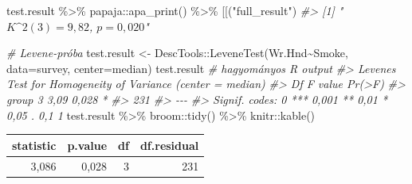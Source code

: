 \documentclass[
]{book}
\newenvironment{Shaded}{\begin{snugshade}}{\end{snugshade}}
\newcommand{\AttributeTok}[1]{\textcolor[rgb]{0.77,0.63,0.00}{#1}}
\newcommand{\CommentTok}[1]{\textcolor[rgb]{0.56,0.35,0.01}{\textit{#1}}}
\newcommand{\FunctionTok}[1]{\textcolor[rgb]{0.00,0.00,0.00}{#1}}
\newcommand{\NormalTok}[1]{#1}
\newcommand{\OtherTok}[1]{\textcolor[rgb]{0.56,0.35,0.01}{#1}}
\newcommand{\SpecialCharTok}[1]{\textcolor[rgb]{0.00,0.00,0.00}{#1}}
\newcommand{\StringTok}[1]{\textcolor[rgb]{0.31,0.60,0.02}{#1}}
\begin{document}
\begin{Shaded}
\begin{Highlighting}[]
\NormalTok{test.result }\SpecialCharTok{\%\textgreater{}\%}\NormalTok{ papaja}\SpecialCharTok{::}\FunctionTok{apa\_print}\NormalTok{() }\SpecialCharTok{\%\textgreater{}\%} \StringTok{\textasciigrave{}}\AttributeTok{[[}\StringTok{\textasciigrave{}}\NormalTok{(}\StringTok{"full\_result"}\NormalTok{)}
\CommentTok{\#\textgreater{} [1] "$K\^{}2(3) = 9,82$, $p = 0,020$"}


\CommentTok{\# Levene{-}próba}
\NormalTok{test.result }\OtherTok{\textless{}{-}}\NormalTok{ DescTools}\SpecialCharTok{::}\FunctionTok{LeveneTest}\NormalTok{(Wr.Hnd}\SpecialCharTok{\textasciitilde{}}\NormalTok{Smoke, }\AttributeTok{data=}\NormalTok{survey, }\AttributeTok{center=}\NormalTok{median)}
\NormalTok{test.result   }\CommentTok{\# hagyományos R output}
\CommentTok{\#\textgreater{} Levene\textquotesingle{}s Test for Homogeneity of Variance (center = median)}
\CommentTok{\#\textgreater{}        Df F value Pr(\textgreater{}F)  }
\CommentTok{\#\textgreater{} group   3    3,09  0,028 *}
\CommentTok{\#\textgreater{}       231                 }
\CommentTok{\#\textgreater{} {-}{-}{-}}
\CommentTok{\#\textgreater{} Signif. codes:  0 \textquotesingle{}***\textquotesingle{} 0,001 \textquotesingle{}**\textquotesingle{} 0,01 \textquotesingle{}*\textquotesingle{} 0,05 \textquotesingle{}.\textquotesingle{} 0,1 \textquotesingle{} \textquotesingle{} 1}
\NormalTok{test.result }\SpecialCharTok{\%\textgreater{}\%}\NormalTok{ broom}\SpecialCharTok{::}\FunctionTok{tidy}\NormalTok{() }\SpecialCharTok{\%\textgreater{}\%}\NormalTok{ knitr}\SpecialCharTok{::}\FunctionTok{kable}\NormalTok{()}
\end{Highlighting}
\end{Shaded}

\begin{tabular}{r|r|r|r}
\hline
statistic & p.value & df & df.residual\\
\hline
3,086 & 0,028 & 3 & 231\\
\hline
\end{tabular}
\end{document}
